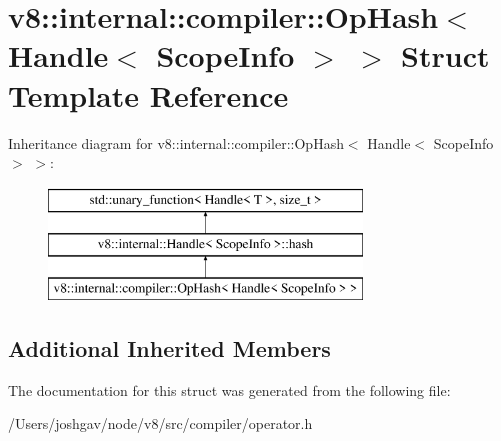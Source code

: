 \hypertarget{structv8_1_1internal_1_1compiler_1_1_op_hash_3_01_handle_3_01_scope_info_01_4_01_4}{}\section{v8\+:\+:internal\+:\+:compiler\+:\+:Op\+Hash$<$ Handle$<$ Scope\+Info $>$ $>$ Struct Template Reference}
\label{structv8_1_1internal_1_1compiler_1_1_op_hash_3_01_handle_3_01_scope_info_01_4_01_4}
Inheritance diagram for v8\+:\+:internal\+:\+:compiler\+:\+:Op\+Hash$<$ Handle$<$ Scope\+Info $>$ $>$\+:\begin{figure}[H]
\begin{center}
\leavevmode
\includegraphics[height=3.000000cm]{structv8_1_1internal_1_1compiler_1_1_op_hash_3_01_handle_3_01_scope_info_01_4_01_4}
\end{center}
\end{figure}
\subsection*{Additional Inherited Members}


The documentation for this struct was generated from the following file\+:\begin{DoxyCompactItemize}
\item 
/\+Users/joshgav/node/v8/src/compiler/operator.\+h\end{DoxyCompactItemize}
